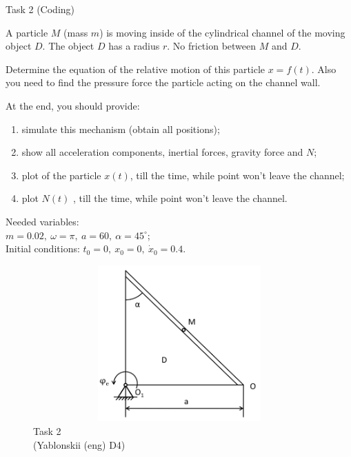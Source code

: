 \documentclass[aspectratio=169]{beamer}
\newcommand{\fbckg}[1]{\usebackgroundtemplate{\texttt{[image: \#1]}}}%
\begin{document}
  \begin{frame}[t]{Task 2 (Coding)}
    \vspace*{-0.5cm}
    \begin{minipage}{0.6\textwidth}
      \scriptsize
      A particle $M$ (mass $m$) is moving inside of the cylindrical channel of the moving object $D$. The object $D$ has a radius $r$. No friction between $M$ and $D$.
  
      Determine the equation of the relative motion of this particle $x=f(t)$. Also you need to find the pressure force the particle acting on the channel wall.
      
      At the end, you should provide:
      \begin{enumerate}
          \item simulate this mechanism (obtain all positions);
          \item show all acceleration components, inertial forces, gravity force and $N$;
          \item plot of the particle $x(t)$, till the time, while point won't leave the channel;
          \item plot $N(t)$ , till the time, while point won't leave the channel.
      \end{enumerate}
      
      Needed variables:\\
      $m=0.02,\ \omega=\pi,\ a = 60,\ \alpha=45^\circ$;\\
      Initial conditions: $t_0=0,\ x_0=0,\ \dot{x}_0=0.4$.
    \end{minipage}
    \begin{minipage}{0.39\textwidth}
      \vspace*{-0.3cm}
      \begin{figure}[H]
        \centering\includegraphics[height=6cm,width=1\textwidth,keepaspectratio]{HW3_2}
        \caption*{ Task 2\\ (Yablonskii (eng) D4)}
      \end{figure}
    \end{minipage}
  \end{frame}

\fbckg{fibeamer/figs/last_page.png}
\frame[plain]{}
\end{document}
